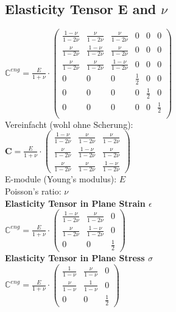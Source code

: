 \documentclass[a4paper]{scrartcl}
\begin{document}
\subsection{Elasticity Tensor E and $\nu$}
$\mathbb{C}^{eng} = \frac{E}{1 + \nu} \cdot \begin{pmatrix}
\frac{1-\nu}{1-2\nu} & \frac{\nu}{1-2\nu} & \frac{\nu}{1-2\nu} & 0 & 0 & 0\\
\frac{\nu}{1-2\nu} & \frac{1-\nu}{1-2\nu} & \frac{\nu}{1-2\nu} & 0 & 0 & 0\\
\frac{\nu}{1-2\nu} & \frac{\nu}{1-2\nu} & \frac{1-\nu}{1-2\nu} & 0 & 0 & 0\\
0 & 0 & 0 & \frac{1}{2} & 0 & 0\\
0 & 0 & 0 & 0 & \frac{1}{2} & 0\\
0 & 0 & 0 & 0 & 0 & \frac{1}{2}\\
\end{pmatrix}$\\
Vereinfacht (wohl ohne Scherung):\\
$\mathbf{C} = \frac{E}{1 + \nu} \cdot \begin{pmatrix}
\frac{1-\nu}{1-2\nu} & \frac{\nu}{1-2\nu} & \frac{\nu}{1-2\nu}\\
\frac{\nu}{1-2\nu} & \frac{1-\nu}{1-2\nu} & \frac{\nu}{1-2\nu}\\
\frac{\nu}{1-2\nu} & \frac{\nu}{1-2\nu} & \frac{1-\nu}{1-2\nu}
\end{pmatrix}$\\

E-module (Young's modulus): $E$\\
Poisson's ratio: $\nu$\\

\textbf{Elasticity Tensor in Plane Strain $\epsilon$}\\
$\mathbb{C}^{eng} = \frac{E}{1 + \nu} \cdot \begin{pmatrix}
\frac{1-\nu}{1-2\nu} & \frac{\nu}{1-2\nu} & 0\\
\frac{\nu}{1-2\nu} & \frac{1-\nu}{1-2\nu} & 0\\
0 & 0 & \frac{1}{2}
\end{pmatrix}$\\

\textbf{Elasticity Tensor in Plane Stress $\sigma$}\\
$\mathbb{C}^{eng} = \frac{E}{1 + \nu} \cdot \begin{pmatrix}
\frac{1}{1-\nu} & \frac{\nu}{1-\nu} & 0\\
\frac{\nu}{1-\nu} & \frac{1}{1-\nu} & 0\\
0 & 0 & \frac{1}{2}
\end{pmatrix}$\\
\end{document}
